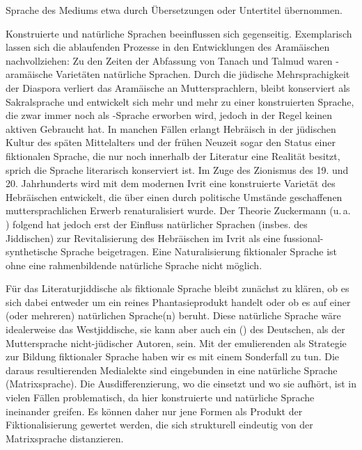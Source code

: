 Sprache des Mediums etwa durch Übersetzungen oder Untertitel übernommen.

 \largerpage %
Konstruierte und natürliche Sprachen beeinflussen sich gegenseitig. Exemplarisch lassen sich die ablaufenden Prozesse in den Entwicklungen des Aramäischen nachvollziehen: Zu den Zeiten der Abfassung von Tanach und Talmud waren -aramäische Varietäten natürliche Sprachen. Durch die jüdische Mehrsprachigkeit der Diaspora verliert das Aramäische an Muttersprachlern, bleibt konserviert als Sakralsprache und entwickelt sich mehr und mehr zu einer konstruierten Sprache, die zwar immer noch als -Sprache erworben wird, jedoch in der Regel keinen aktiven Gebraucht hat. In manchen Fällen erlangt Hebräisch in der jüdischen Kultur des späten Mittelalters und der frühen Neuzeit sogar den Status einer fiktionalen Sprache, die nur noch innerhalb der Literatur eine Realität besitzt, sprich die Sprache literarisch konserviert ist. Im Zuge des Zionismus des 19. und 20. Jahrhunderts wird mit dem modernen Ivrit eine konstruierte Varietät des Hebräischen entwickelt, die über einen durch politische Umstände geschaffenen muttersprachlichen Erwerb renaturalisiert wurde. Der Theorie Zuckermann (u.\,a.\, \citeyear{Zuckermann2004,Zuckermann2006}) folgend hat jedoch erst der Einfluss natürlicher Sprachen (insbes. des Jiddischen) zur Revitalisierung des Hebräischen im Ivrit als eine fussional-synthetische Sprache beigetragen. Eine Naturalisierung fiktionaler Sprache ist ohne eine rahmenbildende natürliche Sprache nicht möglich.

Für das Literaturjiddische als fiktionale Sprache bleibt zunächst zu klären, ob es sich dabei entweder um ein reines Phantasieprodukt handelt oder ob es auf einer (oder mehreren) natürlichen Sprache(n) beruht. Diese natürliche Sprache wäre idealerweise das Westjiddische, sie kann aber auch ein  (\citealt[135]{Haider2007}) des Deutschen, als der Muttersprache nicht-jüdischer Autoren, sein. Mit der emulierenden  als Strategie zur Bildung fiktionaler Sprache haben wir es mit einem Sonderfall zu tun. Die daraus resultierenden Medialekte sind eingebunden in eine natürliche Sprache (Matrixsprache). Die Ausdifferenzierung, wo die  einsetzt und wo sie aufhört, ist in vielen Fällen problematisch, da hier konstruierte und natürliche Sprache ineinander greifen. Es können daher nur jene Formen als Produkt der Fiktionalisierung gewertet werden, die sich strukturell eindeutig von der Matrixsprache distanzieren. 

